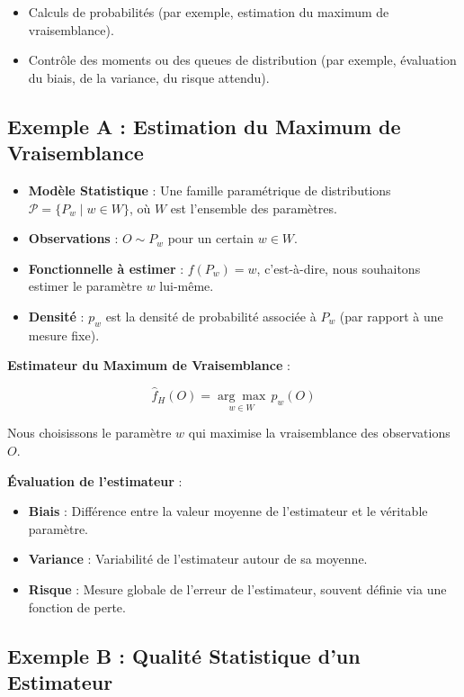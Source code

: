 \documentclass{article}
\begin{document}
\begin{itemize}
    \item Calculs de probabilités (par exemple, estimation du maximum de vraisemblance).
    \item Contrôle des moments ou des queues de distribution (par exemple, évaluation du biais, de la variance, du risque attendu).
\end{itemize}


\subsection{Exemple A : Estimation du Maximum de Vraisemblance}

\begin{itemize}
    \item \textbf{Modèle Statistique} : Une famille paramétrique de distributions $\mathcal{P} = \{ P_w \mid w \in W \}$, où $W$ est l'ensemble des paramètres.
    \item \textbf{Observations} : $O \sim P_w$ pour un certain $w \in W$.
    \item \textbf{Fonctionnelle à estimer} : $f(P_w) = w$, c'est-à-dire, nous souhaitons estimer le paramètre $w$ lui-même.
    \item \textbf{Densité} : $p_w$ est la densité de probabilité associée à $P_w$ (par rapport à une mesure fixe).
\end{itemize}

\textbf{Estimateur du Maximum de Vraisemblance} :

\[
\hat{f}_H(O) = \underset{w \in W}{\arg\max} \, p_w(O)
\]

Nous choisissons le paramètre $w$ qui maximise la vraisemblance des observations $O$.

\textbf{Évaluation de l'estimateur} :

\begin{itemize}
    \item \textbf{Biais} : Différence entre la valeur moyenne de l'estimateur et le véritable paramètre.
    \item \textbf{Variance} : Variabilité de l'estimateur autour de sa moyenne.
    \item \textbf{Risque} : Mesure globale de l'erreur de l'estimateur, souvent définie via une fonction de perte.
\end{itemize}

\subsection{Exemple B : Qualité Statistique d'un Estimateur}
\end{document}
